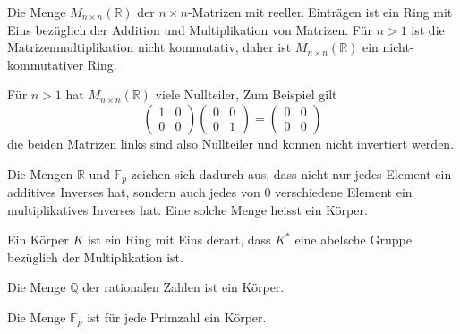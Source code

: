 \begin{beispiel}
Die Menge $M_{n\times n}(\mathbb{R})$ der $n\times n$-Matrizen mit
reellen Einträgen ist ein Ring mit Eins bezüglich der Addition und
Multiplikation von Matrizen.
Für $n>1$ ist die Matrizenmultiplikation nicht kommutativ, daher
ist $M_{n\times n}(\mathbb{R})$ ein nicht-kommutativer Ring.

Für $n>1$ hat $M_{n\times n}(\mathbb{R})$ viele Nullteiler,
Zum Beispiel gilt
\[
\begin{pmatrix}
1&0\\0&0
\end{pmatrix}
\begin{pmatrix}
0&0\\0&1
\end{pmatrix}
=
\begin{pmatrix}
0&0\\
0&0
\end{pmatrix}
\]
die beiden Matrizen links sind also Nullteiler und können nicht
invertiert werden.
\end{beispiel}

Die Mengen $\mathbb{R}$ und $\mathbb{F}_p$ zeichen sich dadurch
aus, dass nicht nur jedes Element ein additives Inverses hat, sondern
auch jedes von $0$ verschiedene Element ein multiplikatives Inverses hat.
Eine solche Menge heisst ein Körper.

\begin{definition}[Körper]
%
Ein Körper $K$ ist ein Ring mit Eins derart, dass $K^*$ eine abelsche
Gruppe bezüglich der Multiplikation ist.
\end{definition}

\begin{beispiel}
Die Menge $\mathbb{Q}$ der rationalen Zahlen ist ein Körper.
%
%
\end{beispiel}

\begin{beispiel}
Die Menge $\mathbb{F}_p$ ist für jede Primzahl ein Körper.
\end{beispiel}

%
%
